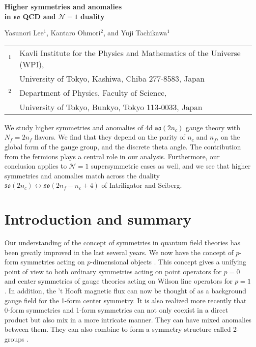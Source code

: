 \documentclass[12pt]{article}
\numberwithin{equation}{section}
\def\Nequals#1{$\mathcal{N}{=}#1$}
\def\so{\mathfrak{so}}
\begin{document}
\begin{titlepage}

\begin{flushright}
\end{flushright}

\vskip 3cm

\begin{center}

{\Large \bfseries Higher symmetries and anomalies \\[1em]
in $\so$ QCD  and \Nequals1 duality}

\vskip 1cm
Yasunori Lee$^1$, Kantaro Ohmori$^2$, and Yuji Tachikawa$^1$
\vskip 1cm

\begin{tabular}{ll}
$^1$ & Kavli Institute for the Physics and Mathematics of the Universe (WPI), \\
& University of Tokyo,  Kashiwa, Chiba 277-8583, Japan\\
$^2$ & Department of Physics, Faculty of Science, \\
& University of Tokyo, Bunkyo, Tokyo 113-0033, Japan
\end{tabular}

\vskip 1cm

\end{center}


\noindent
We study higher symmetries and anomalies of 4d  $\so(2n_c)$ gauge theory with $N_f=2n_f$ flavors.
We find that they depend on the parity of $n_c$ and $n_f$,
on the global form of the gauge group, and the discrete theta angle.
The contribution from the fermions plays a central role in our analysis.
Furthermore, our conclusion applies to \Nequals1 supersymmetric cases as well, and
we see that higher symmetries and anomalies match across the duality 
$\so(2n_c)\leftrightarrow\so(2n_f-n_c+4)$ of Intriligator and Seiberg.


\end{titlepage}

\setcounter{tocdepth}{2}
\tableofcontents

\section{Introduction and summary}
\label{sec:introduction}
Our understanding of the concept of symmetries in quantum field theories has been greatly improved in the last several years.
We now have the concept of $p$-form symmetries acting on $p$-dimensional objects \cite{Gaiotto:2014kfa}.
This concept  gives a unifying point of view to both
ordinary symmetries acting on point operators for $p=0$
and center symmetries of gauge theories acting on Wilson line operators for $p=1$.
In addition, the 't Hooft magnetic flux \cite{tHooft:1979rtg} can now be thought of as a background gauge field for the 1-form center symmetry.
It is also realized more recently that 0-form symmetries and 1-form symmetries can not only coexist in a direct product but also mix in a more intricate manner.
They can have mixed anomalies between them.
They can also combine to form a symmetry structure called 2-groups \cite{Cordova:2018cvg,Benini:2018reh}.
\end{document}
